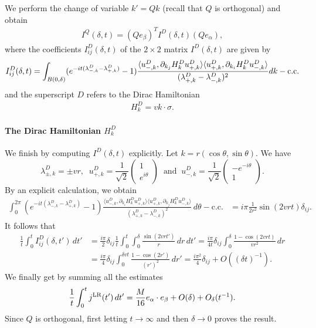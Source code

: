 \documentclass[a4paper,11pt]{article}
\theoremstyle{plain}
\theoremstyle{remark}
\def\1{{\mathds 1}}
\begin{document}
We perform the change of variable $k' = Qk$ (recall that $Q$ is orthogonal) and obtain
\begin{align*}
I^{Q}(\delta,t) = (Qe_\beta)^T I^{D}(\delta,t)(Qe_\alpha),
\end{align*}
where the coefficients $I_{ij}^{D}(\delta,t) $ of the $2\times 2$ matrix  $I^{D}(\delta,t) $ are given by
\begin{align*}
  I_{ij}^{D}(\delta,t) = \int_{B(0,\delta)} (e^{-i t (\lambda^{D}_{-,k} - \lambda^{D}_{+,k})} - 1)\frac{\langle u^{D}_{-,k}, \partial_{k_j} H_k^{D} u^{D}_{+,k} \rangle\langle u^{D}_{+,k},\partial_{k_i} H_k^{D}u^{D}_{-,k}\rangle}{(\lambda^{D}_{+,k} - \lambda^{D}_{-,k})^{2}}dk - {\rm c.c.}
\end{align*}
and the superscript $D$ refers to the Dirac Hamiltonian
\begin{align*}
  H_k^{D} = v k \cdot \sigma.
\end{align*}


\paragraph{The Dirac Hamiltonian $H_k^{D}$}
We finish by computing $I^{D}(\delta,t)$ explicitly. Let
$k=r(\cos \theta, \sin \theta)$. We have
\[  \lambda^{D}_{\pm,k} = \pm v r,\;\;
  u^{D}_{+,k} = \frac 1 {\sqrt 2}
  \begin{pmatrix}
    1\\e^{i\theta}
  \end{pmatrix}\;\;\mbox{and}\;\;
  u^{D}_{-,k}= \frac 1 {\sqrt 2}
  \begin{pmatrix}
    -e^{-i\theta}\\1
  \end{pmatrix}.
  \]
By an explicit calculation, we obtain
\begin{align*}
  \int_{0}^{2\pi}(e^{-i t (\lambda^{D}_{-,k} - \lambda^{D}_{+,k})}-1)\frac{\langle u^{D}_{-,k}, \partial_{k_i} H_k^{D} u^{D}_{+,k} \rangle\langle u^{D}_{+,k},\partial_{k_j} H_k^{D} u^{D}_{-,k}\rangle}{(\lambda^{D}_{+,k} - \lambda^{D}_{-,k})^{2}} \, d\theta - \text{c.c.} &= i\pi \frac 1 {2r^{2}}\sin(2vrt) \delta_{ij}.
\end{align*}
It follows that
\begin{align*}
  \frac 1 t \int_{0}^{t}I_{ij}^{D}(\delta,t') \, dt' &= \frac {i\pi}{2}\delta_{ij} \frac1t\int_0^t \int_{0}^{\delta}\frac{\sin(2vrt')}{r} \, dr \, dt' = \frac{i\pi}{4 t}\delta_{ij}\int_{0}^{\delta}\frac{1 -  \cos(2vrt)}{vr^{2}} \, dr\\
  &=\frac{i\pi}{4} \delta_{ij} \int_{0}^{\delta vt}\frac{1-\cos(2r')}{(r')^2} \, dr' = \frac{i \pi^{2}}{4}\delta_{ij} + O\left((\delta t)^{-1}\right).
\end{align*}
We finally get by summing all the estimates
\begin{align*}
  \frac 1{t} \int_{0}^{t} j^{\rm LR}(t') \, dt' = \frac {M} {16} e_\alpha \cdot e_\beta   +O(\delta)+O_\delta(t^{-1}).
\end{align*}
Since $Q$ is orthogonal, first letting $t\to\infty$ and then
$\delta\to0$ proves the result.
\end{document}
